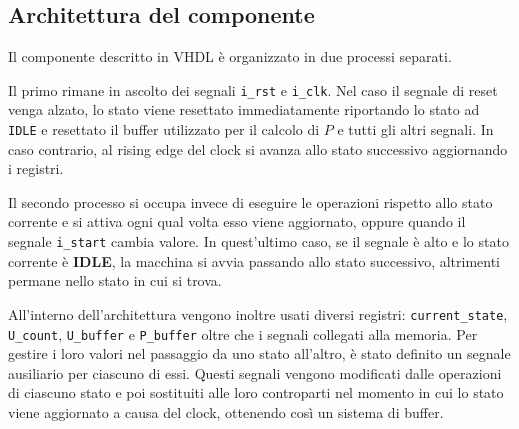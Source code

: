 \subsection{Architettura del componente}

Il componente descritto in VHDL è organizzato in due processi separati.

Il primo rimane in ascolto dei segnali \verb|i_rst| e \verb|i_clk|. Nel caso il segnale di reset venga alzato, lo stato viene resettato immediatamente riportando lo stato ad \verb|IDLE| e resettato il buffer utilizzato per il calcolo di $P$ e tutti gli altri segnali. In caso contrario, al rising edge del clock si avanza allo stato successivo aggiornando i registri.

Il secondo processo si occupa invece di eseguire le operazioni rispetto allo stato corrente e si attiva ogni qual volta esso viene aggiornato, oppure quando il segnale \verb|i_start| cambia valore. In quest'ultimo caso, se il segnale è alto e lo stato corrente è \textbf{IDLE}, la macchina si avvia passando allo stato successivo, altrimenti permane nello stato in cui si trova.

All'interno dell'architettura vengono inoltre usati diversi registri: \verb|current_state|, \verb|U_count|, \verb|U_buffer| e \verb|P_buffer| oltre che i segnali collegati alla memoria. Per gestire i loro valori nel passaggio da uno stato all'altro, è stato definito un segnale ausiliario per ciascuno di essi. Questi segnali vengono modificati dalle operazioni di ciascuno stato e poi sostituiti alle loro controparti nel momento in cui lo stato viene aggiornato a causa del clock, ottenendo così un sistema di buffer.